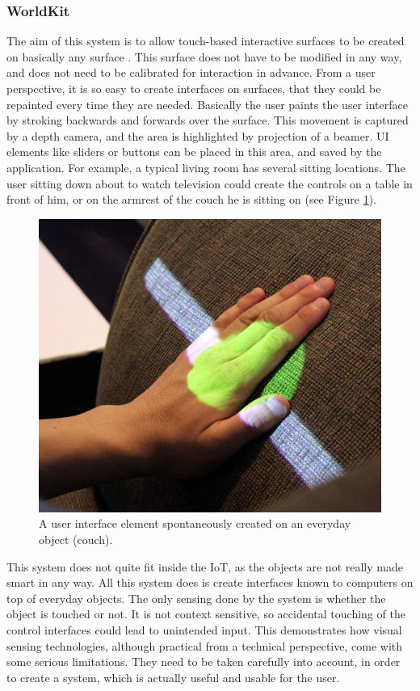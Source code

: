 \subsubsection{WorldKit}
\label{sec:worldKit}
The aim of this system is to allow touch-based interactive surfaces to be created on basically any surface \cite{xiao13}. 
This surface does not have to be modified in any way, and does not need to be calibrated for interaction in advance. 
From a user perspective, it is so easy to create interfaces on surfaces, that they could be repainted every time they are needed. 
Basically the user paints the user interface by stroking backwards and forwards over the surface. 
This movement is captured by a depth camera, and the area is highlighted by projection of a beamer. 
UI elements like sliders or buttons can be placed in this area, and saved by the application. 
For example, a typical living room has several sitting locations. 
The user sitting down about to watch television could create the controls on a table in front of him, or on the armrest of the couch he is sitting on (see Figure \ref{fig:worldkit}).
\begin{figure}[!t]
	\centering
	\includegraphics[width=0.9\columnwidth]{Images/worldkit}
	\caption{A user interface element spontaneously created on an everyday object (couch).}
	\label{fig:worldkit}
\end{figure}

This system does not quite fit inside the IoT, as the objects are not really made smart in any way. 
All this system does is create interfaces known to computers on top of everyday objects. 
The only sensing done by the system is whether the object is touched or not. 
It is not context sensitive, so accidental touching of the control interfaces could lead to unintended input. 
This demonstrates how visual sensing technologies, although practical from a technical perspective, come with some serious limitations. 
They need to be taken carefully into account, in order to create a system, which is actually useful and usable for the user.

